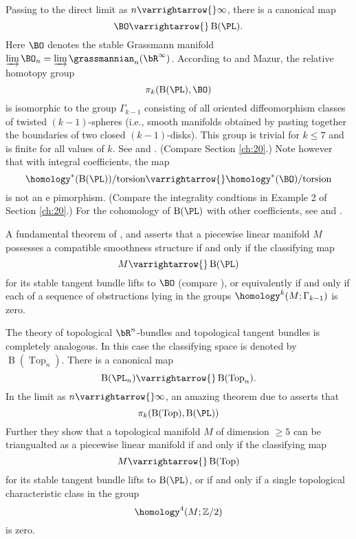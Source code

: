 \documentclass[../main]{subfiles}
\begin{document}
Passing to the direct limit as $n \varrightarrow{} \infty$, there is a canonical map \[\BO \varrightarrow{} \operatorname{B}(\PL).\] Here $\BO$ denotes the stable Grassmann manifold $\varinjlim \BO_n = \varinjlim \grassmannian_n(\bR^\infty)$. According to \cite{hirsch1959} and Mazur, the relative homotopy group \[\pi_k(\operatorname{B}(\PL), \BO)\] is isomorphic to the group $\Gamma_{k-1}$ consisting of all oriented diffeomorphism classes of twisted $(k-1)$-spheres (i.e., smooth manifolds obtained by pasting together the boundaries of two closed $(k-1)$-disks). This group is trivial for $k \leq 7$ and is finite for all values of $k$. See \cite{kervaire-milnor} and \cite{cerf}.  (Compare Section \ref{ch:20}.) Note however that with integral coefficients, the map \[\homology^\ast(\operatorname{B}(\PL))/\text{torsion} \varrightarrow{} \homology^\ast(\BO)/\text{torsion}\]
is not an e pimorphism. (Compare the integrality condtions in Example 2 of Section \ref{ch:20}.) For the cohomology of $\operatorname{B}(\PL)$ with other coefficients, see \cite{williamson} and \cite{brumfiel}.  

A fundamental theorem of \cite{hirsch1959},\cite{munkres1964} and \cite{munkres1968} asserts that a piecewise linear manifold $M$ possesses a compatible smoothness structure if and only if the classifying map \[M \varrightarrow{} \operatorname{B}(\PL) \] for its stable tangent bundle lifts to $\BO$ (compare \cite{milnor1965}), or equivalently if and only if each of a sequence of obstructions lying in the groups $\homology^k(M;\Gamma_{k-1})$ is zero.

The theory of topological $\bR^n$-bundles and topological tangent bundles is completely analogous. In this case the classifying space is denoted by $\operatorname{B}(\operatorname{Top}_n)$. There is a canonical map \[\operatorname{B}(\PL_n) \varrightarrow{} \operatorname{B}(\operatorname{Top}_n).\] In the limit as $n \varrightarrow{} \infty$, an amazing theorem due to \cite{Kirby1969OnTT} asserts that  \[\pi_k(\operatorname{B}(\operatorname{Top}),\operatorname{B}(\PL))\]  Further they show that a topological manifold $M$ of dimension $\geq 5$ can be triangualted as a piecewise linear manifold if and only if the classifying map \[M \varrightarrow{} \operatorname{B}(\operatorname{Top})\] for its stable tangent bundle lifts to $\operatorname{B}(\PL)$, or if and only if a single topological characteristic class in the group \[\homology^4(M;\mathbb{Z}/2)\] is zero.
\end{document}
